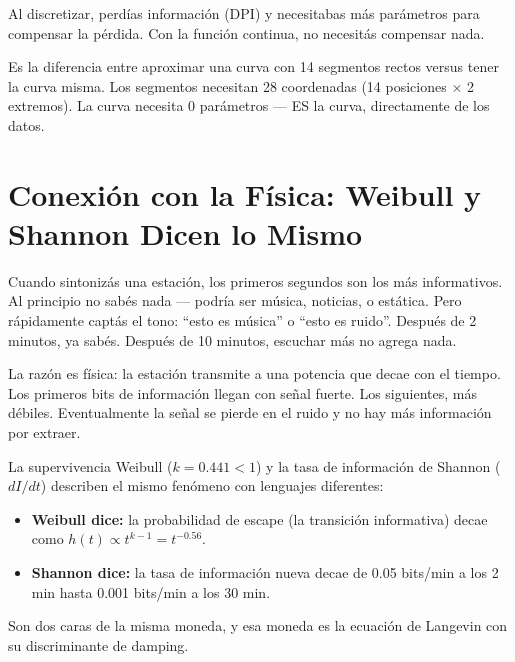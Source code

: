 \documentclass[11pt,a4paper]{article}
\begin{document}
Al discretizar, perd\'ias informaci\'on (DPI) y necesitabas m\'as
par\'ametros para compensar la p\'erdida. Con la funci\'on continua,
no necesit\'as compensar nada.

Es la diferencia entre aproximar una curva con 14 segmentos rectos
versus tener la curva misma. Los segmentos necesitan 28 coordenadas
(14 posiciones $\times$ 2 extremos). La curva necesita 0 par\'ametros
--- ES la curva, directamente de los datos.


\section{Conexi\'on con la F\'isica: Weibull y Shannon Dicen lo Mismo}
\label{sec:weibull_shannon}

\begin{tcolorbox}[radio, title=La radio: por qu\'e el mensaje llega al principio]
Cuando sintoniz\'as una estaci\'on, los primeros segundos son los
m\'as informativos. Al principio no sab\'es nada --- podr\'ia ser
m\'usica, noticias, o est\'atica. Pero r\'apidamente capt\'as el tono:
``esto es m\'usica'' o ``esto es ruido''. Despu\'es de 2 minutos, ya
sab\'es. Despu\'es de 10 minutos, escuchar m\'as no agrega nada.

La raz\'on es f\'isica: la estaci\'on transmite a una potencia que
decae con el tiempo. Los primeros bits de informaci\'on llegan con
se\~nal fuerte. Los siguientes, m\'as d\'ebiles. Eventualmente la
se\~nal se pierde en el ruido y no hay m\'as informaci\'on por extraer.
\end{tcolorbox}

La supervivencia Weibull ($k = 0.441 < 1$) y la tasa de informaci\'on
de Shannon ($dI/dt$) describen el mismo fen\'omeno con lenguajes
diferentes:

\begin{itemize}[leftmargin=1.5em]
\item \textbf{Weibull dice:} la probabilidad de escape (la transici\'on
  informativa) decae como $h(t) \propto t^{k-1} = t^{-0.56}$.
\item \textbf{Shannon dice:} la tasa de informaci\'on nueva decae de
  0.05 bits/min a los 2 min hasta 0.001 bits/min a los 30 min.
\end{itemize}

Son dos caras de la misma moneda, y esa moneda es la ecuaci\'on de
Langevin con su discriminante de damping.
\end{document}

